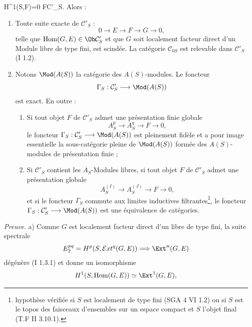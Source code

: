 H^1(S,F)=0\quad
{}F\in\Ob\mathcal C'_S.
\]
Alors :
\begin{enumerate}[label=\alph*)]
\item Toute suite exacte de $\mathcal C'_S$ :
\[
0\longrightarrow E\longrightarrow F\longrightarrow G\longrightarrow0,
\]
telle que $\operatorname{Hom}(G,E)
\in\Ob\mathcal C'_S$ et que $G$ soit localement facteur direct d'un Module libre de type fini, est scindée. La catégorie $\mathcal C_{0S}$ est relevable dans $\mathcal C'_S$ (I 1.2).
\item Notons $\Mod(A(S))$ la catégorie des $A(S)$-modules. Le foncteur
\[
\Gamma_S:\mathcal C'_S\longrightarrow\Mod(A(S))
\]
est exact. En outre :
\begin{enumerate}[label=(\roman*)]
\item Si tout objet $F$ de $\mathcal C'_S$ admet une présentation finie globale
\[
A_S^p\longrightarrow A_S^q\longrightarrow F\longrightarrow0,
\]
le foncteur $\Gamma_S:\mathcal C'_S\longrightarrow\Mod(A(S))$ est pleinement fidèle et a pour image essentielle la sous-catégorie pleine de $\Mod(A(S))$ formée des $A(S)$-modules de présentation finie ;
\item Si $\mathcal C'_S$ contient les $A_S$-Modules libres, si tout objet $F$ de $\mathcal C'_S$ admet une présentation globale
\[
A_S^{(I)}\longrightarrow A_S^{(J)}\longrightarrow F\longrightarrow0,
\]
et si le foncteur $\Gamma_S$ commute aux limites inductives filtrantes\footnote{hypothèse vérifiée si $S$ est localement de type fini (SGA 4 VI 1.2) ou si $S$ est le topos des faisceaux d'ensembles sur un espace compact et $S$ l'objet final (T.F II 3.10.1).}, le foncteur $\Gamma_S:\mathcal C'_S\longrightarrow\Mod(A(S))$ est une équivalence de catégories.
\end{enumerate}
\end{enumerate}

\emph{Preuve.} a) Comme $G$ est localement facteur direct d'un libre de type fini, la suite spectrale
\[
E_2^{pq}=H^p(S,\mathcal{E}xt^q(G,E))\Longrightarrow\Ext^{n}(G,E)
\]
dégénère (I 1.3.1) et donne un isomorphisme
\[
H^1(S,\operatorname{Hom}(G,E))\simeq\Ext^1(G,E),
\]
